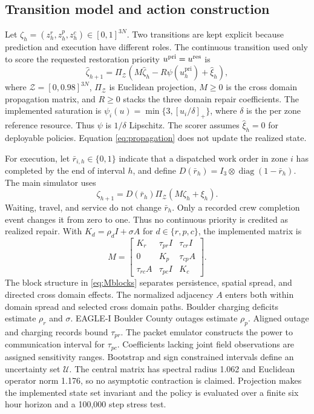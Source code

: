\documentclass[journal]{IEEEtran}
\begin{document}
\subsection{Transition model and action construction}
\label{sec:construction}

Let $\zeta_h=(z_h^r,z_h^p,z_h^c)\in[0,1]^{3N}$.  Two transitions are kept
explicit because prediction and execution have different roles.  The
continuous transition used only to score the requested restoration priority
$u^{\rm pri}=u^{\rm res}$ is
\begin{equation}
\hat\zeta_{h+1}=
\Pi_{\mathcal{Z}}\left(M\hat\zeta_h-R\psi(u_h^{\mathrm{pri}})+\hat\xi_h\right),
\label{eq:propagation}
\end{equation}
where $\mathcal{Z}=[0,0.98]^{3N}$, $\Pi_{\mathcal{Z}}$ is Euclidean projection,
$M\ge0$ is the cross domain propagation matrix, and $R\ge0$ stacks the three
domain repair coefficients.  The implemented saturation is
$\psi_i(u)=\min\{3,[u_i/\delta]_+\}$, where $\delta$ is the per zone reference
resource.  Thus $\psi$ is $1/\delta$ Lipschitz.  The scorer assumes
$\hat\xi_h=0$ for deployable policies.  Equation
\eqref{eq:propagation} does not update the realized state.

For execution, let $\bar r_{i,h}\in\{0,1\}$ indicate that a dispatched work
order in zone $i$ has completed by the end of interval $h$, and define
$D(\bar r_h)=I_3\otimes\operatorname{diag}(1-\bar r_h)$.  The main simulator
uses
\begin{equation}
\zeta_{h+1}=D(\bar r_h)
\Pi_{\mathcal Z}\left(M\zeta_h+\xi_h\right).
\label{eq:executed-propagation}
\end{equation}
Waiting, travel, and service do not change $\bar r_h$.  Only a recorded crew
completion event changes it from zero to one.  Thus no continuous priority is
credited as realized repair.  With
$K_d=\rho_dI+\sigma A$ for $d\in\{r,p,c\}$, the implemented matrix is
\begin{equation}
M=\begin{bmatrix}
K_r&\tau_{pr}I&\tau_{cr}I\\
0&K_p&\tau_{cp}A\\
\tau_{rc}A&\tau_{pc}I&K_c
\end{bmatrix}.
\label{eq:Mblocks}
\end{equation}
The block structure in \eqref{eq:Mblocks} separates persistence, spatial
spread, and directed cross domain effects.  The normalized adjacency $A$
enters both within domain spread and selected
cross domain paths.  Boulder charging deficits estimate $\rho_r$ and $\sigma$.
EAGLE-I Boulder County outages estimate $\rho_p$.  Aligned outage and charging
records bound $\tau_{pr}$.  The packet emulator constructs the
power to communication interval for $\tau_{pc}$.  Coefficients lacking joint
field observations are assigned sensitivity ranges.  Bootstrap and
sign constrained intervals define an uncertainty set $\mathcal U$.  The central
matrix has spectral radius 1.062 and Euclidean operator norm 1.176, so no asymptotic contraction is
claimed.  Projection makes the implemented state set invariant and the policy is
evaluated over a finite six hour horizon and a 100,000 step stress test.
\end{document}

